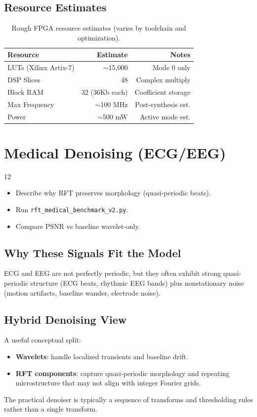 \documentclass[11pt, a4paper, openany]{book}
\theoremstyle{definition}
\begin{document}
\section{Resource Estimates}
\begin{table}[h]
\centering
\begin{tabular}{@{}lrr@{}}\toprule
Resource & Estimate & Notes \\ \midrule
LUTs (Xilinx Artix-7) & $\sim$15,000 & Mode 0 only \\
DSP Slices & 48 & Complex multiply \\
Block RAM & 32 (36Kb each) & Coefficient storage \\
Max Frequency & $\sim$100 MHz & Post-synthesis est. \\
Power & $\sim$500 mW & Active mode est. \\ \bottomrule
\end{tabular}
\caption{Rough FPGA resource estimates (varies by toolchain and optimization).}
\end{table}

\chapter{Medical Denoising (ECG/EEG)}

\begin{todobox}{12}
\begin{itemize}
    \item[$\square$] Describe why RFT preserves morphology (quasi-periodic beats).
    \item[$\square$] Run \texttt{rft\_medical\_benchmark\_v2.py}.
    \item[$\square$] Compare PSNR vs baseline wavelet-only.
\end{itemize}
\end{todobox}

\section{Why These Signals Fit the Model}
ECG and EEG are not perfectly periodic, but they often exhibit strong quasi-periodic structure (ECG beats, rhythmic EEG bands) plus nonstationary noise (motion artifacts, baseline wander, electrode noise).

\section{Hybrid Denoising View}
A useful conceptual split:
\begin{itemize}
    \item \textbf{Wavelets}: handle localized transients and baseline drift.
    \item \textbf{RFT components}: capture quasi-periodic morphology and repeating microstructure that may not align with integer Fourier grids.
\end{itemize}
The practical denoiser is typically a sequence of transforms and thresholding rules rather than a single transform.
\end{document}
